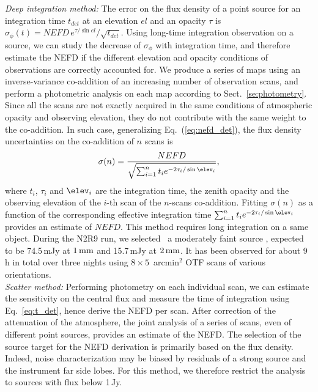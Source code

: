 \noindent \emph{Deep integration method:} The error on the flux density of a
point source for an integration time $t_{det}$ at an elevation $el$
and an opacity $\tau$ is
$\sigma_\phi(t) = NEFD\,e^{\tau/\sin el}/\sqrt{t_{det}}$.
Using long-time integration observation on a source, we can study the
decrease of $\sigma_\phi$ with integration time, and
therefore estimate the NEFD if the different elevation and opacity conditions of
observations are correctly accounted for.  We produce a series of maps using an
inverse-variance co-addition of an increasing number of observation
scans, and perform a photometric analysis on each map according to
Sect.~\ref{se:photometry}. Since
all the scans are not exactly acquired in the same conditions of atmospheric
opacity and observing elevation, they do not contribute with the same weight to
the co-addition. In such case, generalizing Eq.~(\ref{eq:nefd_det}),
the flux density uncertainties on the co-addition of $n$ scans is
%
\begin{equation}
  \sigma(n) = \frac{NEFD}{\sqrt{\sum_{i=1}^{n}t_i e^{-2\tau_i/\sin\elev_i}}},
  \label{eq:sigma_tau_w8}
\end{equation}
where $t_i$, $\tau_i$ and $\elev_i$ are the integration time, the zenith
opacity and the observing elevation of the $i$-th scan of the $n$-scans
co-addition. Fitting $\sigma(n)$ as a function of the corresponding effective
integration time $\sum_{i=1}^{n}t_i e^{-2\tau_i/\sin\elev_i}$ provides an
estimate of $NEFD$. This method requires long integration on a same
object. During the N2R9 run, we selected \hls\, a moderately faint source
\citep{2012A&A...538L...4C}, expected to be 74.5\,mJy at $1\,\rm{mm}$
and 15.7\,mJy at $2\, \rm{mm}$.%
It has been observed for about 9\,h in
total over three nights using $8 \times 5$~arcmin$^2$ OTF scans of various
orientations.\\

\noindent \emph{Scatter method:} Performing photometry on each individual scan,
we can estimate the sensitivity on the central flux and measure the time of
integration using Eq.~\ref{eq:t_det}, hence derive the NEFD per
scan. After correction of the attenuation of the atmosphere, the joint
analysis of a series of scans, even of different point sources, provides 
an estimate of the NEFD. The selection of the source target
for the NEFD derivation is primarily based on the flux density. Indeed, noise
characterization may be biased by residuals of a strong source and the
instrument far side lobes. For this method, we therefore restrict the
analysis to sources with flux below 1\,Jy.

